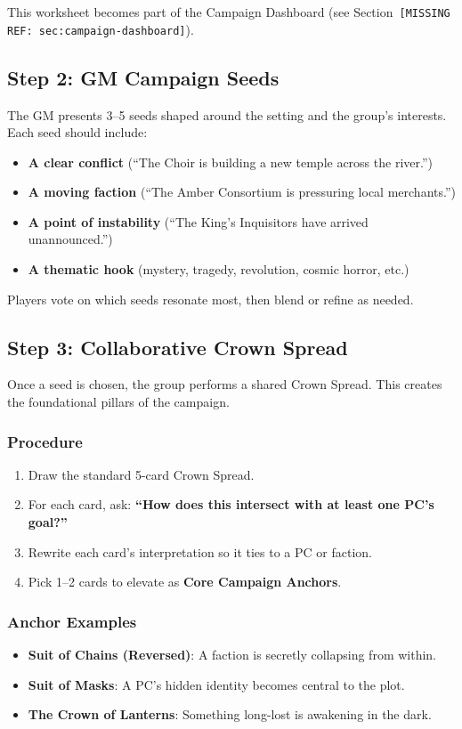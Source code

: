\documentclass[11pt]{article}
\begin{document}
This worksheet becomes part of the Campaign Dashboard (see Section~\texttt{[MISSING REF: sec:campaign-dashboard]}).

\subsection{Step 2: GM Campaign Seeds}
The GM presents 3--5 seeds shaped around the setting and the group's interests. Each seed should include:

\begin{itemize}
    \item \textbf{A clear conflict} (``The Choir is building a new temple across the river.'')
    \item \textbf{A moving faction} (``The Amber Consortium is pressuring local merchants.'')
    \item \textbf{A point of instability} (``The King's Inquisitors have arrived unannounced.'')
    \item \textbf{A thematic hook} (mystery, tragedy, revolution, cosmic horror, etc.)
\end{itemize}

Players vote on which seeds resonate most, then blend or refine as needed.

\subsection{Step 3: Collaborative Crown Spread}

Once a seed is chosen, the group performs a shared Crown Spread. This creates the foundational pillars of the campaign.

\subsubsection{Procedure}
\begin{enumerate}
    \item Draw the standard 5-card Crown Spread.
    \item For each card, ask: \textbf{``How does this intersect with at least one PC's goal?''}
    \item Rewrite each card's interpretation so it ties to a PC or faction.
    \item Pick 1--2 cards to elevate as \textbf{Core Campaign Anchors}.
\end{enumerate}

\subsubsection{Anchor Examples}
\begin{itemize}
    \item \textbf{Suit of Chains (Reversed)}: A faction is secretly collapsing from within.
    \item \textbf{Suit of Masks}: A PC's hidden identity becomes central to the plot.
    \item \textbf{The Crown of Lanterns}: Something long-lost is awakening in the dark.
\end{itemize}
\end{document}
